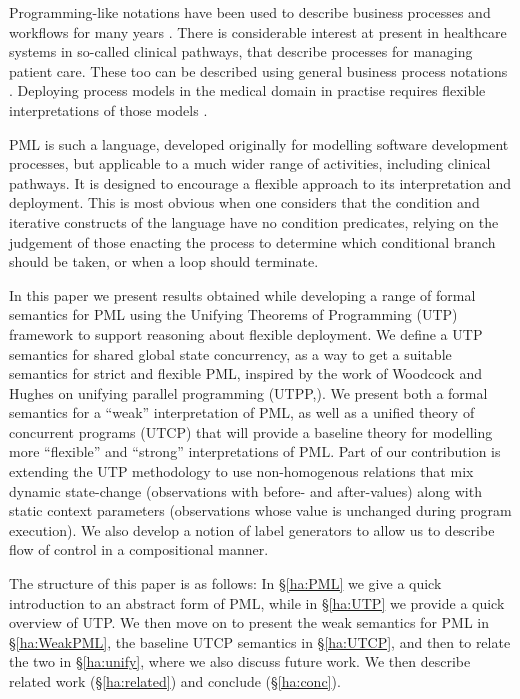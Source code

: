 \label{ha:intro}


Programming-like notations have been used
to describe business processes and workflows for many years
\cite{Campbell98,Combi09,Yang12}.
There is considerable interest at present in healthcare systems
in so-called clinical pathways,
that describe processes for managing patient care.
These too can be described using general business process notations
\cite{Ellis93,Eshuis03,vanderAalst06}.
Deploying process models in the medical domain in practise requires
flexible interpretations of those models
\cite{Ellis93,Ellis95,Grigori01,vanderAalst06,Pesic06,Combi09}
.

PML is such a language\cite{DBLP:journals/infsof/AtkinsonWN07},
developed originally for modelling software development processes,
but applicable to a much wider range of activities,
including clinical pathways\cite{LNR:CP-models:FHIES2013}.
It is designed to encourage a flexible approach to its interpretation
and deployment.
This is most obvious when one considers that the condition and iterative
constructs of the language have no condition predicates,
relying on the judgement of those enacting the process to determine
which conditional branch should be taken, or when a loop should terminate.


In this paper we present results obtained while developing
a range of formal semantics for PML using the
Unifying Theorems of Programming (UTP) framework\cite{Hoare-He98}
to support reasoning about flexible deployment.
We define a UTP semantics for  shared global state concurrency,
as a way to get a suitable semantics for strict and flexible PML,
inspired by the work of Woodcock and Hughes on unifying parallel programming (UTPP,\cite{DBLP:conf/icfem/WoodcockH02}).
We  present
both a formal semantics for a ``weak'' interpretation of PML,
as well as a unified theory of concurrent programs (UTCP)
that will provide a baseline theory for modelling more ``flexible''
and ``strong'' interpretations of PML.
Part of our contribution is extending the UTP methodology
to use non-homogenous relations that mix dynamic state-change
(observations with before- and after-values)
along with static context parameters
(observations whose value is unchanged during program execution).
We also develop a notion of label generators to allow us to describe
flow of control in a compositional manner.

The structure of this paper is as follows:
In \S\ref{ha:PML} we give a quick introduction to an abstract form of PML,
while in \S\ref{ha:UTP} we provide a quick overview of UTP.
We then move on to present the weak semantics for PML in \S\ref{ha:WeakPML},
the baseline UTCP semantics in \S\ref{ha:UTCP},
and then to relate the two in \S\ref{ha:unify},
where we also discuss future work.
We then describe related work (\S\ref{ha:related}) and conclude (\S\ref{ha:conc}).
